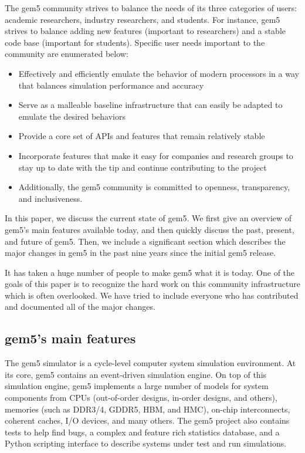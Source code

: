 The gem5 community strives to balance the needs of its three categories of users: academic researchers, industry researchers, and students.
For instance, gem5 strives to balance adding new features (important to researchers) and a stable code base (important for students).
Specific user needs important to the community are enumerated below:
\begin{itemize}
    \item Effectively and efficiently emulate the behavior of modern processors in a way that balances simulation performance and accuracy
    \item Serve as a malleable baseline infrastructure that can easily be adapted to emulate the desired behaviors
    \item Provide a core set of APIs and features that remain relatively stable
    \item Incorporate features that make it easy for companies and research groups to stay up to date with the tip and continue contributing to the project
    \item Additionally, the gem5 community is committed to openness, transparency, and inclusiveness.
\end{itemize}

In this paper, we discuss the current state of gem5.
We first give an overview of gem5's main features available today, and then quickly discuss the past, present, and future of gem5.
Then, we include a significant section which describes the major changes in gem5 in the past nine years since the initial gem5 release.

It has taken a huge number of people to make gem5 what it is today.
One of the goals of this paper is to recognize the hard work on this community infrastructure which is often overlooked.
We have tried to include everyone who has contributed and documented all of the major changes.

\subsection{gem5's main features}

The gem5 simulator is a cycle-level computer system simulation environment.
At its core, gem5 contains an event-driven simulation engine.
On top of this simulation engine, gem5 implements a large number of models for system components from CPUs (out-of-order designs, in-order designs, and others), memories (such as DDR3/4, GDDR5, HBM, and HMC), on-chip interconnects, coherent caches, I/O devices, and many others.
The gem5 project also contains tests to help find bugs, a complex and feature rich statistics database, and a Python scripting interface to describe systems under test and run simulations.

